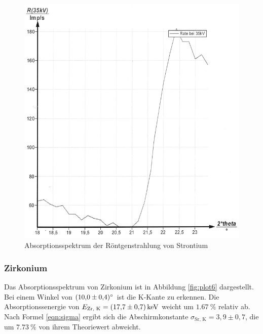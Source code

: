 \begin{figure}[H]
  \centering
  \includegraphics[scale=0.3]{content/bild5.png}
  \caption{Absorptionsspektrum der Röntgenstrahlung von Strontium}
  \label{fig:plot5}
\end{figure}

\subsubsection{Zirkonium}

Das Absorptionsspektrum von Zirkonium ist in Abbildung \ref{fig:plot6} dargestellt.
Bei einem Winkel von $\SI{10.0 +- 0.4}{\degree}$ ist die K-Kante zu erkennen. Die
Absorptionssenergie von $E_\text{Zr, K} = \SI{17.7 +- 0.7}{\kilo\eV}$ weicht
um $\SI{1.67}{\percent}$ relativ ab. Nach Formel \eqref{eqn:sigma} ergibt 
sich die Abschirmkonstante $\sigma_\text{Sr, K} = 3,9 \pm 0,7$, die um 
$\SI{7.73}{\percent}$ von ihrem Theoriewert abweicht.


